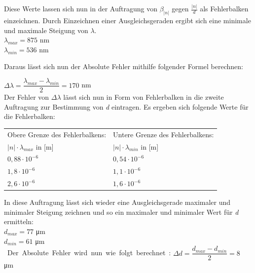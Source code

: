 \documentclass[12pt,a4paper,titlepage,headinclude,bibtotoc]{scrartcl}
\begin{document}
\begin{flushleft}
Diese Werte lassen sich nun in der Auftragung von $ \beta_{|n|} $ gegen $ \frac{|n|}{d} $ als Fehlerbalken einzeichnen. Durch Einzeichnen einer Ausgleichsgeraden ergibt sich eine minimale und maximale Steigung von $ \lambda $.\\
\vspace{0,5 cm}
$ \lambda_{max} = 875$ nm\\
$ \lambda_{min} = 536 $ nm\\
\vspace{0,5 cm}


Daraus lässt sich nun der Absolute Fehler mithilfe folgender Formel berechnen:\\
\vspace{0,5 cm}

$ \Delta \lambda = \dfrac{ \lambda_{max}-\lambda_{min}}{2}= 170 $ nm\\
\vspace{0,5 cm}
Der Fehler von $ \Delta \lambda $ lässt sich nun in Form von Fehlerbalken in die zweite Auftragung zur Bestimmung von \emph{d} eintragen. Es ergeben sich folgende Werte für die Fehlerbalken:
\vspace{1 cm}

\begin{table} [h]
\centering
\begin{tabular}{|p{6 cm}|p{6 cm}|}
		\hline
         Obere Grenze des Fehlerbalkens: & Untere Grenze des Fehlerbalkens: \\
         
         $ {|n|} \cdot {\lambda_{max}} $ in [m] & $ {|n|} \cdot {\lambda_{min}} $ in [m] \\
         \hline
         ${0,88} \cdot {10^{-6}} $& ${0,54} \cdot {10^{-6}} $ \\
         \hline
         ${1,8} \cdot {10^{-6}} $& ${1,1} \cdot {10^{-6}} $\\
         \hline
         ${2,6} \cdot {10^{-6}} $&${1,6} \cdot {10^{-6}} $ \\
         \hline
\end{tabular}
\end{table}

 
In diese Auftragung lässt sich wieder eine Ausgleichsgerade maximaler und minimaler Steigung zeichnen und so ein maximaler und minimaler Wert für \emph{d} ermitteln:\\
$ d_{max} = 77$ \si\micro m \\
$ d_{min} = 61 $ \si\micro m\\
Der Absolute Fehler wird nun wie folgt berechnet:
$ \Delta d = \dfrac{ d_{max}-d_{min}}{2}= 8$ \si\micro m\\
\end{flushleft}
\end{document}
